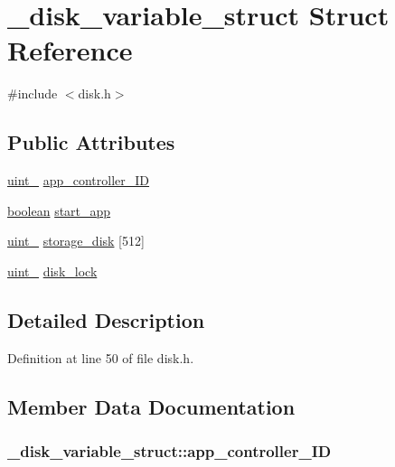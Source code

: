 \hypertarget{struct__disk__variable__struct}{}\section{\+\_\+disk\+\_\+variable\+\_\+struct Struct Reference}
\label{struct__disk__variable__struct}


{\ttfamily \#include $<$disk.\+h$>$}

\subsection*{Public Attributes}
\begin{DoxyCompactItemize}
\item 
\hyperlink{types_8h_ad3209046c23f739a81581c10a4be7d92}{uint\+\_} \hyperlink{struct__disk__variable__struct_ae28835ba815979d604deb95bcf7252b7}{app\+\_\+controller\+\_\+\+ID}
\item 
\hyperlink{types_8h_a7670a4e8a07d9ebb00411948b0bbf86d}{boolean} \hyperlink{struct__disk__variable__struct_a9ac73f96a2aa78c08e6607597f0bc6bf}{start\+\_\+app}
\item 
\hyperlink{types_8h_ad3209046c23f739a81581c10a4be7d92}{uint\+\_} \hyperlink{struct__disk__variable__struct_a69e1fce9adb96b4b608c53d85912d2d0}{storage\+\_\+disk} \mbox{[}512\mbox{]}
\item 
\hyperlink{types_8h_ad3209046c23f739a81581c10a4be7d92}{uint\+\_} \hyperlink{struct__disk__variable__struct_a834d2c78b5aeb5a94fa2414628827861}{disk\+\_\+lock}
\end{DoxyCompactItemize}


\subsection{Detailed Description}


Definition at line 50 of file disk.\+h.



\subsection{Member Data Documentation}
\subsubsection[{\texorpdfstring{app\+\_\+controller\+\_\+\+ID}{app_controller_ID}}]{ \+\_\+disk\+\_\+variable\+\_\+struct\+::app\+\_\+controller\+\_\+\+ID}\hypertarget{struct__disk__variable__struct_ae28835ba815979d604deb95bcf7252b7}{}\label{struct__disk__variable__struct_ae28835ba815979d604deb95bcf7252b7}


